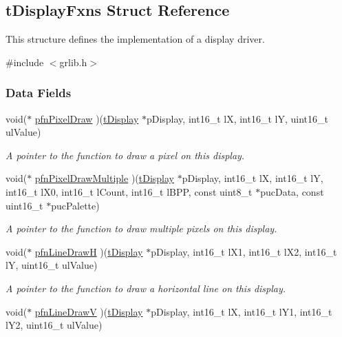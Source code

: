 \subsection{t\+Display\+Fxns Struct Reference}
\label{structt_display_fxns}


This structure defines the implementation of a display driver.  




{\ttfamily \#include $<$grlib.\+h$>$}

\subsubsection*{Data Fields}
\begin{DoxyCompactItemize}
\item 
void($\ast$ \hyperlink{structt_display_fxns_aba4cb20d0c76f62c3b4a81e5887bc4f2}{pfn\+Pixel\+Draw} )(\hyperlink{structt_display}{t\+Display} $\ast$p\+Display, int16\+\_\+t l\+X, int16\+\_\+t l\+Y, uint16\+\_\+t ul\+Value)
\begin{DoxyCompactList}\small\item\em A pointer to the function to draw a pixel on this display. \end{DoxyCompactList}\item 
void($\ast$ \hyperlink{structt_display_fxns_a95214d850a92705637a5d7d7a4d933fb}{pfn\+Pixel\+Draw\+Multiple} )(\hyperlink{structt_display}{t\+Display} $\ast$p\+Display, int16\+\_\+t l\+X, int16\+\_\+t l\+Y, int16\+\_\+t l\+X0, int16\+\_\+t l\+Count, int16\+\_\+t l\+B\+P\+P, const uint8\+\_\+t $\ast$puc\+Data, const uint16\+\_\+t $\ast$puc\+Palette)
\begin{DoxyCompactList}\small\item\em A pointer to the function to draw multiple pixels on this display. \end{DoxyCompactList}\item 
void($\ast$ \hyperlink{structt_display_fxns_a154f087fd9eae1772c62016122bf3e05}{pfn\+Line\+Draw\+H} )(\hyperlink{structt_display}{t\+Display} $\ast$p\+Display, int16\+\_\+t l\+X1, int16\+\_\+t l\+X2, int16\+\_\+t l\+Y, uint16\+\_\+t ul\+Value)
\begin{DoxyCompactList}\small\item\em A pointer to the function to draw a horizontal line on this display. \end{DoxyCompactList}\item 
void($\ast$ \hyperlink{structt_display_fxns_a5fff17e767fde1b95ec3334e3ce5c39d}{pfn\+Line\+Draw\+V} )(\hyperlink{structt_display}{t\+Display} $\ast$p\+Display, int16\+\_\+t l\+X, int16\+\_\+t l\+Y1, int16\+\_\+t l\+Y2, uint16\+\_\+t ul\+Value)

\end{DoxyCompactItemize}
